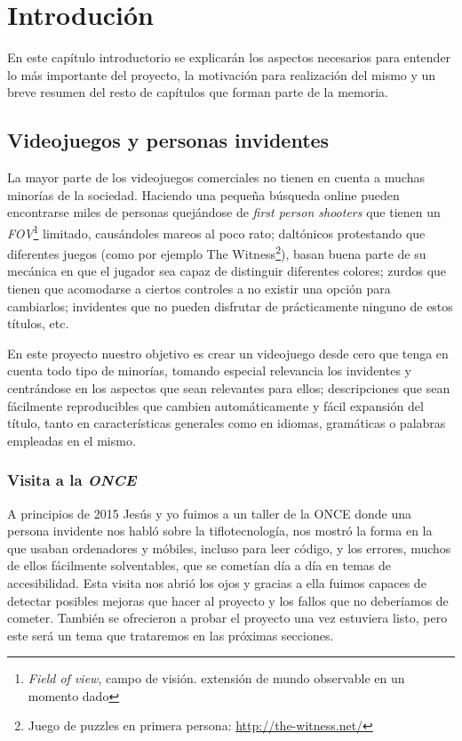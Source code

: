 \chapter[Introdución]{Introdución}

En este capítulo introductorio se explicarán los aspectos necesarios para entender lo más importante del proyecto, la motivación para realización del mismo y un breve resumen del resto de capítulos que forman parte de la memoria.

\section{Videojuegos y personas invidentes}
La mayor parte de los videojuegos comerciales no tienen en cuenta a muchas minorías de la sociedad. Haciendo una pequeña búsqueda online pueden encontrarse miles de personas quejándose de \textit{first person shooters} que tienen un \textit{FOV}\footnote{\textit{Field of view}, campo de visión. extensión de mundo observable en un momento dado} limitado, causándoles mareos al poco rato; daltónicos protestando que diferentes juegos (como por ejemplo The Witness\footnote{Juego de puzzles en primera persona: \url{http://the-witness.net/}}), basan buena parte de su mecánica en que el jugador sea capaz de distinguir diferentes colores; zurdos que tienen que acomodarse a ciertos controles a no existir una opción para cambiarlos; invidentes que no pueden disfrutar de prácticamente ninguno de estos títulos, etc.

En este proyecto nuestro objetivo es crear un videojuego desde cero que tenga en cuenta todo tipo de minorías, tomando especial relevancia los invidentes y centrándose en los aspectos que sean relevantes para ellos; descripciones que sean fácilmente reproducibles que cambien automáticamente y fácil expansión del título, tanto en características generales como en idiomas, gramáticas o palabras empleadas en el mismo.

\subsection{Visita a la \textit{ONCE}}
A principios de 2015 Jesús y yo fuimos a un taller de la ONCE donde una persona invidente nos habló sobre la tiflotecnología, nos mostró la forma en la que usaban ordenadores y móbiles, incluso para leer código, y los errores, muchos de ellos fácilmente solventables, que se cometían día a día en temas de accesibilidad. Esta visita nos abrió los ojos y gracias a ella fuimos capaces de detectar posibles mejoras que hacer al proyecto y los fallos que no deberíamos de cometer. También se ofrecieron a probar el proyecto una vez estuviera listo, pero este será un tema que trataremos en las próximas secciones.

